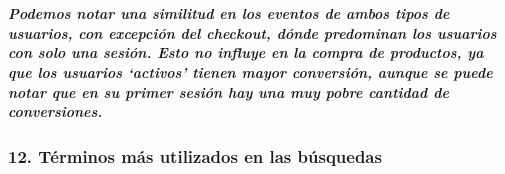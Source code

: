 \documentclass[11pt]{article}
\begin{document}
    \begin{center}
    \end{center}
    { \hspace*{\fill} \\}
    
    \hypertarget{podemos-notar-una-similitud-en-los-eventos-de-ambos-tipos-de-usuarios-con-excepciuxf3n-del-checkout-duxf3nde-predominan-los-usuarios-con-solo-una-sesiuxf3n.-esto-no-influye-en-la-compra-de-productos-ya-que-los-usuarios-activos-tienen-mayor-conversiuxf3n-aunque-se-puede-notar-que-en-su-primer-sesiuxf3n-hay-una-muy-pobre-cantidad-de-conversiones.}{%
\subparagraph{Podemos notar una similitud en los eventos de ambos tipos
de usuarios, con excepción del checkout, dónde predominan los usuarios
con solo una sesión. Esto no influye en la compra de productos, ya que
los usuarios `activos' tienen mayor conversión, aunque se puede notar
que en su primer sesión hay una muy pobre cantidad de
conversiones.}\label{podemos-notar-una-similitud-en-los-eventos-de-ambos-tipos-de-usuarios-con-excepciuxf3n-del-checkout-duxf3nde-predominan-los-usuarios-con-solo-una-sesiuxf3n.-esto-no-influye-en-la-compra-de-productos-ya-que-los-usuarios-activos-tienen-mayor-conversiuxf3n-aunque-se-puede-notar-que-en-su-primer-sesiuxf3n-hay-una-muy-pobre-cantidad-de-conversiones.}}

    \hypertarget{tuxe9rminos-muxe1s-utilizados-en-las-buxfasquedas}{%
\subsubsection{12. Términos más utilizados en las
búsquedas}\label{tuxe9rminos-muxe1s-utilizados-en-las-buxfasquedas}}
\end{document}
